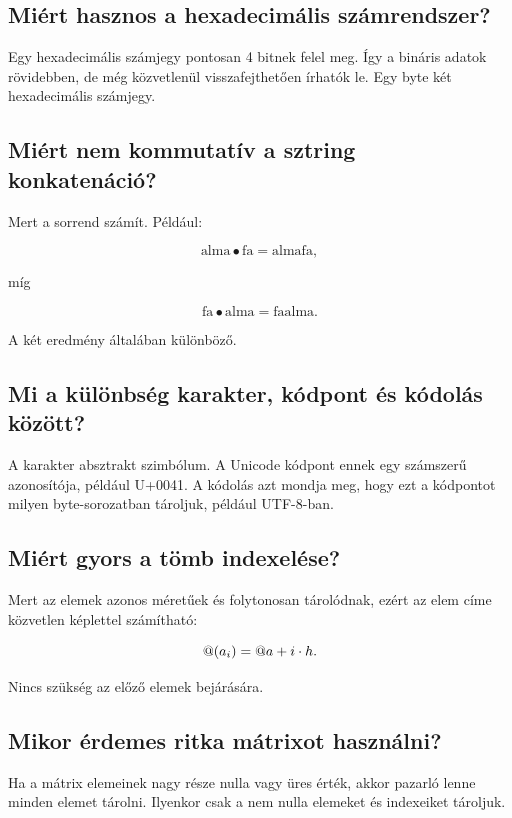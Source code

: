 \subsection{Miért hasznos a hexadecimális számrendszer?}

Egy hexadecimális számjegy pontosan 4 bitnek felel meg. Így a bináris adatok rövidebben, de még közvetlenül visszafejthetően írhatók le. Egy byte két hexadecimális számjegy.

\subsection{Miért nem kommutatív a sztring konkatenáció?}

Mert a sorrend számít. Például:

\[
\text{alma}\bullet\text{fa}=\text{almafa},
\]

míg

\[
\text{fa}\bullet\text{alma}=\text{faalma}.
\]

A két eredmény általában különböző.

\subsection{Mi a különbség karakter, kódpont és kódolás között?}

A karakter absztrakt szimbólum. A Unicode kódpont ennek egy számszerű azonosítója, például U+0041. A kódolás azt mondja meg, hogy ezt a kódpontot milyen byte-sorozatban tároljuk, például UTF-8-ban.

\subsection{Miért gyors a tömb indexelése?}

Mert az elemek azonos méretűek és folytonosan tárolódnak, ezért az elem címe közvetlen képlettel számítható:

\[
@(a_i)=@ a+i\cdot h.
\]

Nincs szükség az előző elemek bejárására.

\subsection{Mikor érdemes ritka mátrixot használni?}

Ha a mátrix elemeinek nagy része nulla vagy üres érték, akkor pazarló lenne minden elemet tárolni. Ilyenkor csak a nem nulla elemeket és indexeiket tároljuk.


